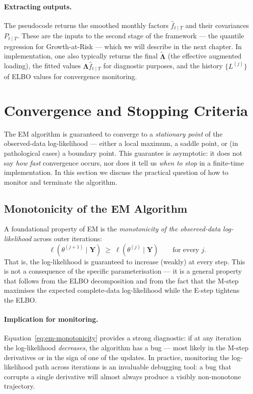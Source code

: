\documentclass[11pt, a4paper, oneside]{article}
\newcommand{\mL}{\boldsymbol{\Lambda}}
\begin{document}
\paragraph{Extracting outputs.}
The pseudocode returns the smoothed monthly factors
$\hat{f}_{t \mid T}$ and their covariances $P_{t \mid T}$. These are
the inputs to the second stage of the framework — the quantile
regression for Growth-at-Risk — which we will describe in the next
chapter. In implementation, one also typically returns the final
$\tilde{\mL}$ (the effective augmented loading), the fitted
values $\mL \hat{f}_{t \mid T}$ for diagnostic purposes,
and the history $\{L^{(j)}\}$ of ELBO values for convergence
monitoring.

\newpage
\section{Convergence and Stopping Criteria}
\label{sec:convergence}

The EM algorithm is guaranteed to converge to a \emph{stationary point}
of the observed-data log-likelihood — either a local maximum, a saddle
point, or (in pathological cases) a boundary point. This guarantee is
asymptotic: it does not say \emph{how fast} convergence occurs, nor
does it tell us \emph{when to stop} in a finite-time implementation.
In this section we discuss the practical question of how to monitor
and terminate the algorithm.

\subsection{Monotonicity of the EM Algorithm}
\label{subsec:monotonicity}

A foundational property of EM is the \emph{monotonicity of the
observed-data log-likelihood} across outer iterations:
\begin{equation}
\ell(\theta^{(j+1)} \mid \mathbf{Y}) \;\geq\; \ell(\theta^{(j)} \mid \mathbf{Y})
\qquad \text{for every } j.
\label{eq:em-monotonicity}
\end{equation}
That is, the log-likelihood is guaranteed to increase (weakly) at
every step. This is not a consequence of the specific parameterisation
— it is a general property that follows from the ELBO decomposition
and from the fact that the M-step maximises the expected complete-data
log-likelihood while the E-step tightens the ELBO.

\paragraph{Implication for monitoring.}
Equation~\eqref{eq:em-monotonicity} provides a strong diagnostic: if
at any iteration the log-likelihood \emph{decreases}, the algorithm
has a bug — most likely in the M-step derivatives or in the sign of
one of the updates. In practice, monitoring the log-likelihood path
across iterations is an invaluable debugging tool: a bug that corrupts
a single derivative will almost always produce a visibly non-monotone
trajectory.
\end{document}
